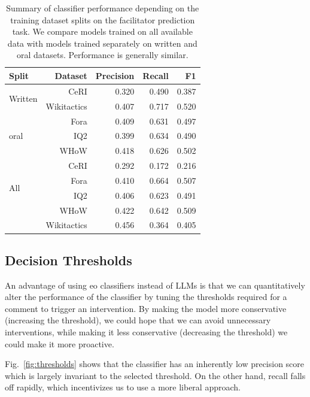 \documentclass[11pt]{article}
\theoremstyle{definition}
\theoremstyle{plain}
\begin{document}
\begin{table}[ht]
	\small
	\centering
	\begin{tabular}{lrrrr}
		\toprule
		Split & Dataset & Precision & Recall & F1 \\
		\midrule
		\multirow{2}{*}{Written} & CeRI      & 0.320 & 0.490 & 0.387 \\
		& Wikitactics & 0.407 & 0.717 & 0.520 \\
		\midrule
		\multirow{3}{*}{oral} & Fora      & 0.409 & 0.631 & 0.497 \\
		& IQ2       & 0.399 & 0.634 & 0.490 \\
		& WHoW      & 0.418 & 0.626 & 0.502 \\
		\midrule
		\multirow{4}{*}{All}   & CeRI      & 0.292 & 0.172 & 0.216 \\
		& Fora      & 0.410 & 0.664 & 0.507 \\
		& IQ2       & 0.406 & 0.623 & 0.491 \\
		& WHoW      & 0.422 & 0.642 & 0.509 \\
		& Wikitactics & 0.456 & 0.364 & 0.405 \\
		\bottomrule
	\end{tabular}
	\caption{Summary of classifier performance depending on the training dataset splits on the facilitator prediction task. We compare models trained on all available data with models trained separately on written and oral datasets. Performance is generally similar.}
	\label{tab:merged_metrics}
\end{table}


\subsection{Decision Thresholds}
\label{app:experiments:thresholds}

An advantage of using \ac{eo} classifiers instead of LLMs is that we can quantitatively alter the performance of the classifier by tuning the thresholds required for a comment to trigger an intervention. By making the model more conservative (increasing the threshold), we could hope that we can avoid unnecessary interventions, while making it less conservative (decreasing the threshold) we could make it more proactive.

Fig.~\ref{fig:thresholds} shows that the classifier has an inherently low precision score which is largely invariant to the selected threshold. On the other hand, recall falls off rapidly, which incentivizes us to use a more liberal approach.
\end{document}
